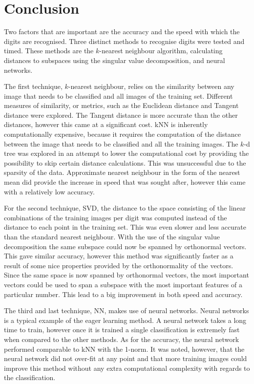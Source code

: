 \section{Conclusion}\label{s:conclusion}
Two factors that are important are the accuracy and the speed with which the digits are recognised.
Three distinct methods to recognise digits were tested and timed.
These methods are the \(k\)-nearest neighbour algorithm, calculating distances to subspaces using the singular value decomposition, and neural networks.

The first technique, \(k\)-nearest neighbour, relies on the similarity between any image that needs to be classified and all images of the training set.
Different measures of similarity, or metrics, such as the Euclidean distance and Tangent distance were explored. The Tangent distance is more accurate than the other distances, however this came at a significant cost.
kNN is inherently computationally expensive, because it requires the computation of the distance between the image that needs to be classified and all the training images.
The \(k\)-d tree was explored in an attempt to lower the computational cost by providing the possibility to skip certain distance calculations. This was unsuccessful due to the sparsity of the data.
Approximate nearest neighbour in the form of the nearest mean did provide the increase in speed that was sought after, however this came with a relatively low accuracy.

For the second technique, SVD, the distance to the space consisting of the linear combinations of the training images per digit was computed instead of the distance to each point in the training set.
This was even slower and less accurate than the standard nearest neighbour.
With the use of the singular value decomposition the same subspace could now be spanned by orthonormal vectors.
This gave similar accuracy, however this method was significantly faster as a result of some nice properties provided by the orthonormality of the vectors.
Since the same space is now spanned by orthonormal vectors, the most important vectors could be used to span a subspace with the most important features of a particular number.
This lead to a big improvement in both speed and accuracy.

The third and last technique, NN, makes use of neural networks.
Neural networks is a typical example of the eager learning method.
A neural network takes a long time to train, however once it is trained a single classification is extremely fast when compared to the other methods.
As for the accuracy, the neural network performed comparable to kNN with the 1-norm.
It was noted, however, that the neural network did not over-fit at any point and that more training images could improve this method without any extra computational complexity with regards to the classification.

